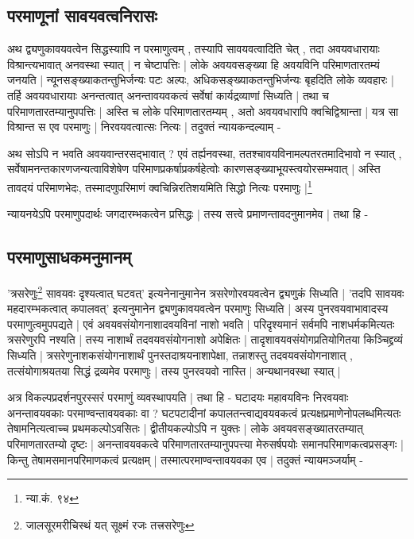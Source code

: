 \subsection{परमाणूनां सावयवत्वनिरासः}

अथ द्व्यणुकावयवत्वेन सिद्धस्यापि न परमाणुत्वम् , तस्यापि सावयवत्वादिति चेत् , तदा अवयवधारायाः विश्रान्त्यभावात् अनवस्था स्यात् | न चेष्टापत्तिः | लोके  अवयवसङ्ख्या हि अवयविनि परिमाणतारतम्यं जनयति | न्यूनसङ्ख्याकतन्तुभिर्जन्यः पटः अल्पः, अधिकसङ्ख्याकतन्तुभिर्जन्यः बृहदिति लोके व्यवहारः | तर्हि अवयवधारायाः अनन्तत्वात् अनन्तावयवकत्वं सर्वेषां कार्यद्रव्याणां सिध्यति | तथा च परिमाणतारतम्यानुपपत्तिः | अस्ति च लोके परिमाणतारतम्यम् , अतो अवयवधारापि क्वचिद्विश्रान्ता | यत्र सा विश्रान्त स एव परमाणुः | निरवयवत्वात्सः नित्यः | तदुक्तं न्यायकन्दल्याम् - 

{\fontsize{11.7}{0}\selectfont\s अथ सोऽपि न भवति अवयवान्तरसद्भावात् ? एवं तर्ह्यनवस्था, ततश्चावयविनामल्पतरतमादिभावो न स्यात् , सर्वेषामनन्तकारणजन्यत्वाविशेषेण परिमाणप्रकर्षाप्रकर्षहेत्वोः कारणसङ्ख्याभूयस्त्वयोरसम्भवात् | अस्ति तावदयं परिमाणभेदः, तस्मादणुपरिमाणं क्वचिन्निरतिशयमिति सिद्धो नित्यः परमाणुः |\footnote{न्या.कं. ९४}}



न्यायनयेऽपि परमाणुपदार्थः जगदारम्भकत्वेन प्रसिद्धः | तस्य सत्त्वे प्रमाणन्तावदनुमानमेव | तथा हि -

\subsection{परमाणुसाधकमनुमानम्}

'त्रसरेणुः\footnote{जालसूरमरीचिस्थं यत् सूक्ष्मं रजः तत्त्रसरेणुः} सावयवः दृश्यत्वात् घटवत्' इत्यनेनानुमानेन त्रसरेणोरवयवत्वेन द्व्यणुकं सिध्यति | 'तदपि सावयवः महदारम्भकत्वात् कपालवत्' इत्यनुमानेन द्व्यणुकावयवत्वेन परमाणुः सिध्यति | अस्य पुनरवयवाभावादस्य परमाणुत्वमुपपद्यते | एवं अवयवसंयोगनाशादवयविनां नाशो भवति | परिदृश्यमानं सर्वमपि नाशधर्मकमित्यतः त्रसरेणुरपि नश्यति | तस्य नाशार्थं तदवयवसंयोगनाशो अपेक्षितः | तादृशावयवसंयोगप्रतियोगितया‌ किञ्चिद्द्रव्यं सिध्यति | त्रसरेणुनाशकसंयोगनाशार्थं पुनस्तदाश्रयनाशापेक्षा, तन्नाशस्तु तदवयवसंयोगनाशात् , तत्संयोगाश्रयतया सिद्धं द्रव्यमेव परमाणुः‌ | तस्य पुनरवयवो नास्ति | अन्यथानवस्था स्यात् |

अत्र विकल्पप्रदर्शनपुरस्सरं परमाणुं व्यवस्थापयति | तथा हि - घटादयः महावयविनः निरवयवाः अनन्तावयवकाः परमाण्वन्तावयवकाः वा ? घटपटादीनां कपालतन्त्वाद्यवयवकत्वं प्रत्यक्षप्रमाणेनोपलब्धमित्यतः तेषामनित्यत्वाच्च प्रथमकल्पोऽवसितः | द्वीतीयकल्पोऽपि न युक्तः | लोके अवयवसङ्ख्यातरतम्यात् परिमाणतारतम्यो दृष्टः | अनन्तावयवकत्वे परिमाणतारतम्यानुपपत्त्या मेरुसर्षपयोः समानपरिमाणकत्वप्रसङ्गः | किन्तु तेषामसमानपरिमाणकत्वं प्रत्यक्षम् | तस्मात्परमाण्वन्तावयवका एव | तदुक्तं न्यायमञ्जर्याम् - 


